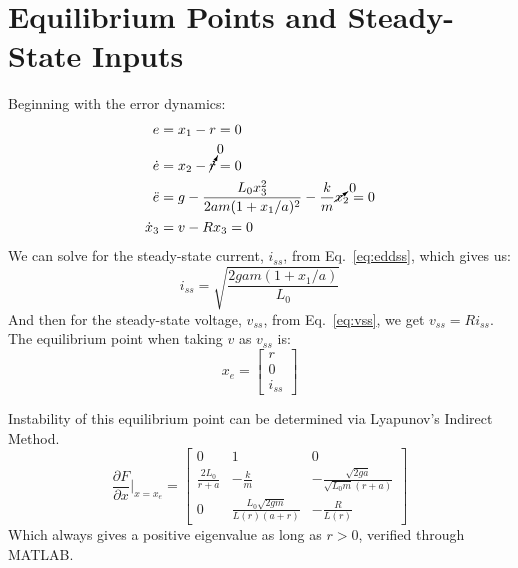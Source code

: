 \documentclass{article}
\begin{document}
\section{Equilibrium Points and Steady-State Inputs}
Beginning with the error dynamics:
\begin{align}
    e &= x_1 - r  = 0 \nonumber \\
    \dot{e} &= x_2 - \cancelto{0}{\dot{r}} = 0 \nonumber \\
    \ddot{e} &= g - \frac{L_0x_3^2}{2am(1 + x_1/a)^2} - \frac{k}{m}\cancelto{0}{x}_2 = 0 \label{eq:eddss} \\
    \dot{x}_3 &= v - Rx_3 = 0 \label{eq:vss}
\end{align}
We can solve for the steady-state current, $i_{ss}$, from Eq.~\ref{eq:eddss}, which gives us:
\begin{equation}
    i_{ss} = \sqrt{\frac{2gam(1+x_1/a)}{L_0}}
\end{equation}
And then for the steady-state voltage, $v_{ss}$, from Eq.~\ref{eq:vss}, we get $v_{ss} = Ri_{ss}$.
The equilibrium point when taking $v$ as $v_{ss}$ is:
\begin{equation}
    x_e = \begin{bmatrix} r \\ 0 \\ i_{ss} \end{bmatrix} \nonumber
\end{equation}
\par
\noindent
Instability of this equilibrium point can be determined via Lyapunov's Indirect Method.
\begin{equation*}
    \frac{\partial F}{\partial x}\Bigr|_{x = x_e} = \begin{bmatrix} 0 & 1 & 0 \\
                                                                    \frac{2L_0}{r+a} & -\frac{k}{m} & -\frac{\sqrt{2ga}}{\sqrt{L_0m}(r+a)} \\
                                                                    0 & \frac{L_0\sqrt{2gm}}{L(r)(a + r)} & -\frac{R}{L(r)}
                                                                \end{bmatrix}
\end{equation*}
Which always gives a positive eigenvalue as long as $r > 0$, verified through MATLAB.
\end{document}
